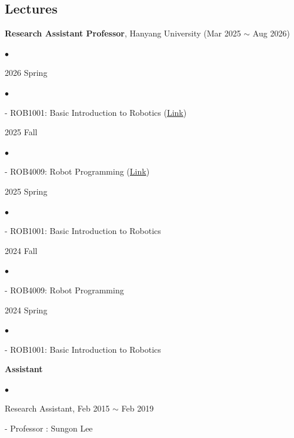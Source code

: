 \documentclass[margin,line]{res}
\newenvironment{list1}{
  \begin{list}{\ding{113}}{%
      \setlength{\itemsep}{0.1in}
      \setlength{\parsep}{0in} \setlength{\parskip}{0in}
      \setlength{\topsep}{0in} \setlength{\partopsep}{0in} 
      \setlength{\leftmargin}{0.17in}}}
      {\end{list}}
\newenvironment{list2}{
  \begin{list}{$\bullet$}{%
      \setlength{\itemsep}{0.05in}
      \setlength{\parsep}{0in} \setlength{\parskip}{0in}
      \setlength{\topsep}{0in} \setlength{\partopsep}{0in} 
      \setlength{\leftmargin}{0.2in}}}{\end{list}}
\begin{document}
\begin{resume}
\section{\sc Lectures}
{\bf Research Assistant Professor}, Hanyang University (Mar 2025 $\sim$ Aug 2026) \\
\begin{list2}
\item {2026 Spring}
    \begin{list2} %
    \item[] - ROB1001: Basic Introduction to Robotics (\href{https://github.com/normajeane-m/ROB1001}{Link})
    \end{list2}
\vspace*{.02in}
\item {2025 Fall}
    \begin{list2}
    \item[] - ROB4009: Robot Programming (\href{https://github.com/normajeane-m/ROB4009}{Link})
    \end{list2}
\vspace*{.02in}
\item {2025 Spring}
    \begin{list2}
    \item[] - ROB1001: Basic Introduction to Robotics 
    \end{list2}
\vspace*{.02in}
\item {2024 Fall}
    \begin{list2}
    \item[] - ROB4009: Robot Programming 
    \end{list2}
\vspace*{.02in}
\item {2024 Spring}
    \begin{list2}
    \item[] - ROB1001: Basic Introduction to Robotics 
    \end{list2}
\end{list2}
{\bf Assistant}\\
\vspace*{-.1in}
\begin{list2}
\item Research Assistant, Feb 2015 $\sim$ Feb 2019
\begin{list1}
\vspace*{.04in}
\item[] - Professor : Sungon Lee
\end{list1}
\end{list2}


\end{resume}
\end{document}
